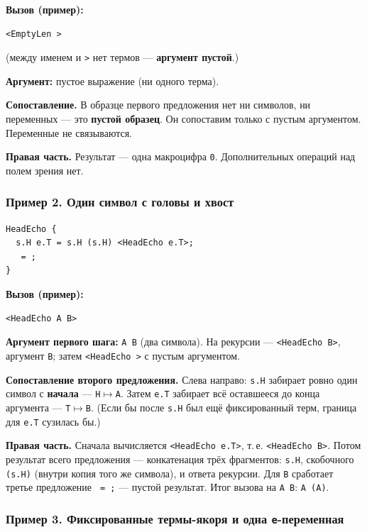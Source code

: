 \documentclass[12pt,a4paper]{article}
\begin{document}
\noindent\textbf{Вызов (пример):}
\begin{lstlisting}
<EmptyLen >
\end{lstlisting}
(между именем и \texttt{>} нет термов --- \textbf{аргумент пустой}.)

\textbf{Аргумент:} пустое выражение (ни одного терма).

\textbf{Сопоставление.} В образце первого предложения нет ни символов, ни переменных --- это \textbf{пустой образец}. Он сопоставим только с пустым аргументом. Переменные не связываются.

\textbf{Правая часть.} Результат --- одна макроцифра \texttt{0}. Дополнительных операций над полем зрения нет.

\subsubsection*{Пример 2. Один символ с головы и хвост}

\begin{lstlisting}
HeadEcho {
  s.H e.T = s.H (s.H) <HeadEcho e.T>;
   = ;
}
\end{lstlisting}

\noindent\textbf{Вызов (пример):}
\begin{lstlisting}
<HeadEcho A B>
\end{lstlisting}
\textbf{Аргумент первого шага:} \texttt{A B} (два символа). На рекурсии --- \texttt{<HeadEcho B>}, аргумент \texttt{B}; затем \texttt{<HeadEcho >} с пустым аргументом.

\textbf{Сопоставление второго предложения.} Слева направо: \texttt{s.H} забирает ровно один символ с \textbf{начала} --- \texttt{H$\mapsto$A}. Затем \texttt{e.T} забирает всё оставшееся до конца аргумента --- \texttt{T$\mapsto$B}. (Если бы после \texttt{s.H} был ещё фиксированный терм, граница для \texttt{e.T} сузилась бы.)

\textbf{Правая часть.} Сначала вычисляется \texttt{<HeadEcho e.T>}, т.\,е. \texttt{<HeadEcho B>}. Потом результат всего предложения --- конкатенация трёх фрагментов: \texttt{s.H}, скобочного \texttt{(s.H)} (внутри копия того же символа), и ответа рекурсии. Для \texttt{B} сработает третье предложение \texttt{ = ;} --- пустой результат. Итог вызова на \texttt{A B}: \texttt{A (A)}.

\subsubsection*{Пример 3. Фиксированные термы-якоря и одна \texttt{e}-переменная}
\end{document}
